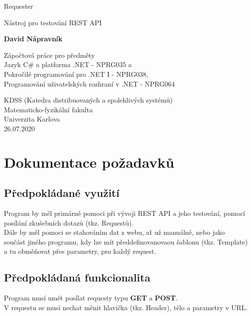 \documentclass[a4paper]{article}
\begin{document}
\begin{titlepage}
\begin{center}
\vspace*{1cm}

{\huge Requester}

\vspace{0.5cm}
Nástroj pro testování REST API

\vspace{1.5cm}

\textbf{David Nápravník}

\vfill

Zápočtová práce pro předměty\\
Jazyk C\# a platforma .NET - NPRG035 a\\
Pokročilé programování pro .NET I - NPRG038,\\
Programování uživatelských rozhraní v .NET - NPRG064


\vspace{0.8cm}


KDSS (Katedra distribuovaných a spolehlivých systémů)\\
Matematicko-fyzikální fakulta\\
Univerzita Karlova\\
26.07.2020

\end{center}
\end{titlepage}

\tableofcontents
\pagebreak

\section{Dokumentace požadavků}
    \subsection{Předpokládané využití}
        Program by měl primárně pomoci při vývoji REST API a
        jeho testování, pomocí posílání zkušebních dotazů (tkz. Requestů).\\
        Dále by měl pomoci se stahováním dat z webu, ať už manuálně, nebo 
        jako součást jiného programu, kdy lze mít předdefinovanovaou šablonu
        (tkz. Template) a tu obměňovat přes parametry, pro každý request.
    \subsection{Předpokládaná funkcionalita}
        Program musí umět posílat requesty typu \textbf{GET} a \textbf{POST}.\\
        V requestu se musí nechat měnit hlavička (tkz. Header), tělo a parametry
        v URL.
\end{document}
